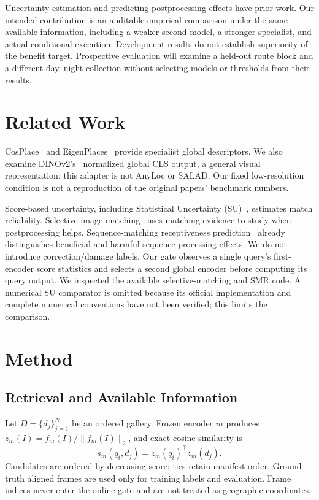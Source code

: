 \documentclass[conference]{IEEEtran}
\begin{document}
Uncertainty estimation and predicting postprocessing effects have prior
work. Our intended contribution is an auditable empirical comparison
under the same available information, including a weaker second model,
a stronger specialist, and actual conditional execution. Development
results do not establish superiority of the benefit target. Prospective
evaluation will examine a held-out route block and a different day--night
collection without selecting models or thresholds from their results.

\section{Related Work}
CosPlace~\cite{cosplace} and EigenPlaces~\cite{eigenplaces} provide
specialist global descriptors. We also examine DINOv2's~\cite{dinov2}
normalized global CLS output, a general visual representation; this
adapter is not AnyLoc or SALAD. Our fixed low-resolution condition is
not a reproduction of the original papers' benchmark numbers.

Score-based uncertainty, including Statistical Uncertainty
(SU)~\cite{doubt}, estimates match reliability. Selective image
matching~\cite{match} uses matching evidence to study when postprocessing
helps. Sequence-matching receptiveness prediction~\cite{smr} already
distinguishes beneficial and harmful sequence-processing effects. We do
not introduce correction/damage labels. Our gate observes a single
query's first-encoder score statistics and selects a second global
encoder before computing its query output. We inspected the available
selective-matching and SMR code. A numerical SU comparator is omitted
because its official implementation and complete numerical conventions
have not been verified; this limits the comparison.

\section{Method}
\subsection{Retrieval and Available Information}
Let $D=\{d_j\}_{j=1}^{N}$ be an ordered gallery. Frozen encoder $m$ produces
$z_m(I)=f_m(I)/\|f_m(I)\|_2$, and exact cosine similarity is
\begin{equation}
s_m(q_i,d_j)=z_m(q_i)^\top z_m(d_j).
\end{equation}
Candidates are ordered by decreasing score; ties retain manifest order.
Ground-truth aligned frames are used only for training labels and
evaluation. Frame indices never enter the online gate and are not treated
as geographic coordinates.
\end{document}
